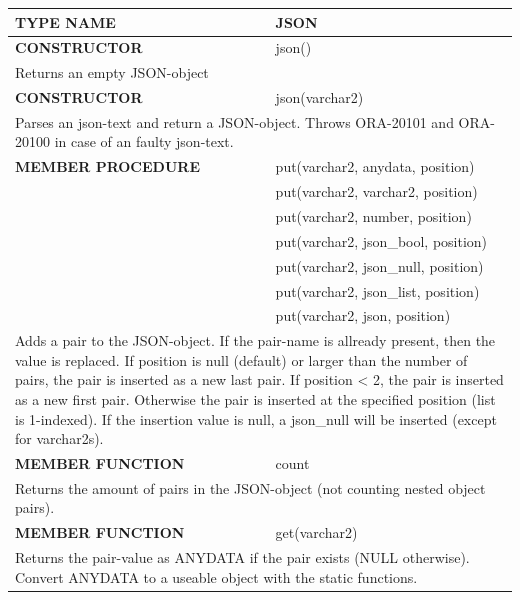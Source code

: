 \documentclass[11pt,twocolumn, a4paper]{article}
\begin{document}
\begin{longtable}{| l | l |}
\hline
  \rowcolor{gray}\color{white}\textbf{TYPE NAME} & \color{white}\textbf{JSON} \\
\hline

\hline
  \textbf{CONSTRUCTOR} & json()\\
\hline
  \multicolumn{2}{|p{15cm}|}{Returns an empty JSON-object} \\
\hline

\hline
  \textbf{CONSTRUCTOR} & json(varchar2)\\
\hline
  \multicolumn{2}{|p{15cm}|}{Parses an json-text and return a JSON-object. 
Throws ORA-20101 and ORA-20100 in case of an faulty json-text.} \\
\hline

\hline
  \textbf{MEMBER PROCEDURE} & put(varchar2, anydata, position)\\
  & put(varchar2, varchar2, position)\\
  & put(varchar2, number, position)\\
  & put(varchar2, json\_bool, position)\\
  & put(varchar2, json\_null, position)\\
  & put(varchar2, json\_list, position)\\
  & put(varchar2, json, position)\\
\hline
  \multicolumn{2}{|p{15cm}|}{Adds a pair to the JSON-object. If the pair-name is allready present, then the value is replaced. If position is null (default) or larger than the number of pairs, the pair is inserted as a new last pair. If position < 2, the pair is inserted as a new first pair. Otherwise the pair is inserted at the specified position (list is 1-indexed). If the insertion value is null, a json\_null will be inserted (except for varchar2s).} \\
\hline

\hline
  \textbf{MEMBER FUNCTION} & count\\
\hline
  \multicolumn{2}{|p{15cm}|}{Returns the amount of pairs in the JSON-object (not counting nested object pairs).} \\
\hline

\hline
  \textbf{MEMBER FUNCTION} & get(varchar2)\\
\hline
  \multicolumn{2}{|p{15cm}|}{Returns the pair-value as ANYDATA if the pair exists (NULL otherwise). Convert ANYDATA to a useable object with the static functions.} \\
\hline


\end{longtable}
\end{document}
